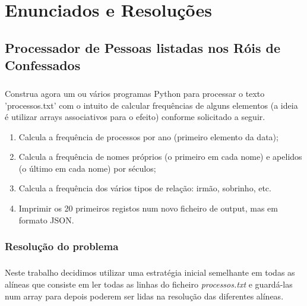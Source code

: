 \documentclass[11pt,a4paper]{report}
\begin{document}
    \chapter{Enunciados e Resoluções}
    \section{Processador de Pessoas listadas nos Róis de Confessados}
    \paragraph{}
    Construa agora um ou vários programas Python para processar o texto 'processos.txt' com o intuito de calcular frequências de alguns elementos (a ideia é utilizar arrays associativos para o efeito) conforme solicitado a seguir.

    \begin{enumerate}[label=\alph*)]
        \item Calcula a frequência de processos por ano (primeiro elemento da data);
        \item Calcula a frequência de nomes próprios (o primeiro em cada nome) e apelidos (o último em cada nome) por séculos;
        \item Calcula a frequência dos vários tipos de relação: irmão, sobrinho, etc.
        \item Imprimir os 20 primeiros registos num novo ficheiro de output, mas em formato JSON.
    \end{enumerate}

    \subsection{Resolução do problema}
    \paragraph{}
    Neste trabalho decidimos utilizar uma estratégia inicial semelhante em todas as alíneas que consiste em ler todas as linhas do ficheiro \textit{processos.txt} e guardá-las num array para depois poderem ser lidas na resolução das diferentes alíneas.
\end{document}
